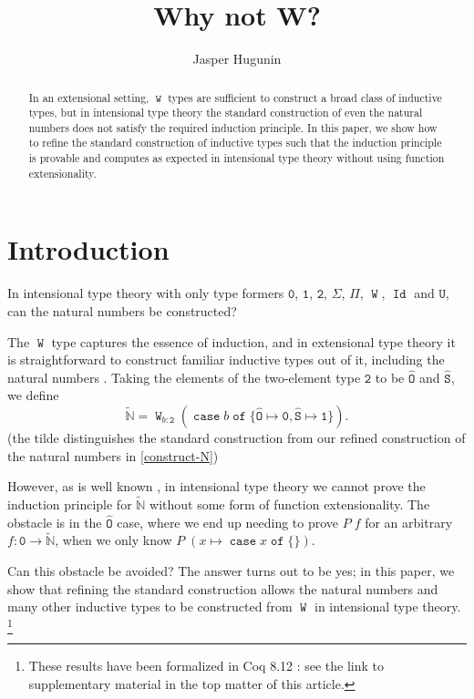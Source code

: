 \documentclass[a4paper,UKenglish,cleveref,nameinlink,autoref,thm-restate]{lipics-v2019}
\title{Why not W?}
\author{Jasper Hugunin}{Carnegie Mellon University, Pittsburgh PA, USA}{jasper@hugunin.net}{https://orcid.org/0000-0002-1133-5354}{}
\newcommand{\zero}{\mathtt{0}}
\newcommand{\one}{\mathtt{1}}
\newcommand{\bool}{\mathtt{2}}
\newcommand{\codeO}{\mathtt{\hat{O}}}
\newcommand{\codeS}{\mathtt{\hat{S}}}
\newcommand{\U}{\mathtt{U}}
\newcommand{\preN}{\hyperref[define-preN]{\tilde{\mathbb{N}}}}
\DeclareMathOperator{\case}{\mathtt{case}}
\newcommand{\caset}[2]{\case {#1}\;\mathtt{of}\;\{{#2}\}}
\DeclareMathOperator{\W}{\mathtt{W}}
\DeclareMathOperator{\Idop}{\mathtt{Id}}
\begin{document}
\maketitle

\begin{abstract}
In an extensional setting, $\W$ types are sufficient to construct a broad class of inductive types, but in intensional type theory the standard construction of even the natural numbers does not satisfy the required induction principle. In this paper, we show how to refine the standard construction of inductive types such that the induction principle is provable and computes as expected in intensional type theory without using function extensionality.
\end{abstract}

\section{Introduction}

In intensional type theory with only type formers $\zero$, $\one$, $\bool$, $\Sigma$, $\Pi$, $\W$, $\Idop$ and $\U$, can the natural numbers be constructed?

The $\W$ type \cite{mltt} captures the essence of induction, and in extensional type theory it is straightforward to construct familiar inductive types out of it, including the natural numbers \cite{dybjer-W-encodes-inductive}.
Taking the elements of the two-element type $\bool$ to be $\codeO$ and $\codeS$, we define \begin{equation}\label{define-preN}\preN = \W_{b : \bool} (\caset{b}{\codeO \mapsto \zero, \codeS \mapsto \one}).\end{equation}
(the tilde distinguishes the standard construction from our refined construction of the natural numbers in \cref{construct-N})

However, as is well known \cite{dybjer-W-encodes-inductive,luo-wellordering,mcbride_wtypes,programming-in-MLTT}, in intensional type theory we cannot prove the induction principle for $\preN$ without some form of function extensionality.
The obstacle is in the $\codeO$ case, where we end up needing to prove $P\;f$ for an arbitrary $f : \zero \to \preN$, when we only know $P\;(x\mapsto\caset{x}{})$.

Can this obstacle be avoided?
The answer turns out to be yes; in this paper, we show that refining the standard construction allows the natural numbers and many other inductive types to be constructed from $\W$ in intensional type theory.
\footnote{These results have been formalized in Coq 8.12 \cite{coq-8.12}: see the link to supplementary material in the top matter of this article.}
\end{document}
